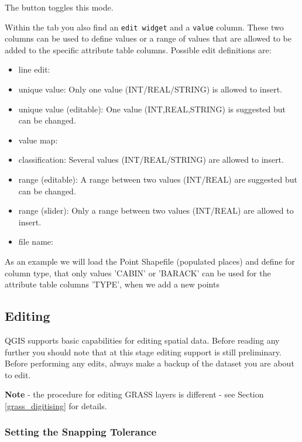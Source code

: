 The button  toggles this mode.


Within the  tab you also find an \texttt{edit widget} and a 
\texttt{value} column. These two columns can be used to define values or a range 
of values that are allowed to be added to the specific attribute table columns. 
Possible edit definitions are:

\begin{itemize}
\item line edit: 
\item unique value: Only one value (INT/REAL/STRING) is allowed to insert.
\item unique value (editable): One value (INT,REAL,STRING) is suggested but can be changed.
\item value map:
\item classification: Several values (INT/REAL/STRING) are allowed to insert.
\item range (editable): A range between two values (INT/REAL) are suggested but can be changed.
\item range (slider): Only a range between two values (INT/REAL) are allowed to insert.
\item file name:
\end{itemize}

As an example we will load the Point Shapefile  (populated places) 
and define for column type, that only values 'CABIN' or 'BARACK' can be used for the 
attribute table columns 'TYPE', when we add a new points 

\subsection{Editing}

QGIS supports basic capabilities for editing spatial data.  Before reading any
further you should note that at this stage editing support is still preliminary.
Before performing any edits, always make a backup of the dataset you are about
to edit. 

\textbf{Note} - the procedure for editing GRASS layers is different - see
Section \ref{grass_digitising} for details.

\subsubsection{Setting the Snapping Tolerance}

